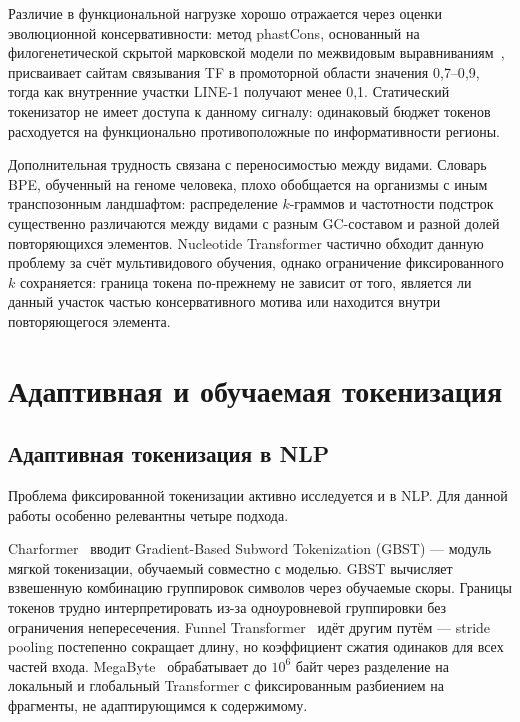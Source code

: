 Различие в функциональной нагрузке хорошо отражается через оценки
эволюционной консервативности: метод phastCons, основанный на
филогенетической скрытой марковской модели по межвидовым
выравниваниям~\cite{siepelEvolutionarilyConservedElements2005},
присваивает сайтам связывания TF в промоторной области значения
0{,}7--0{,}9, тогда как внутренние участки LINE-1 получают менее
0{,}1. Статический токенизатор не имеет доступа к данному сигналу:
одинаковый бюджет токенов расходуется на функционально
противоположные по информативности регионы.

Дополнительная трудность связана с переносимостью между видами.
Словарь BPE, обученный на геноме человека, плохо обобщается на
организмы с иным транспозонным ландшафтом: распределение $k$-граммов
и частотности подстрок существенно различаются между видами с разным
GC-составом и разной долей повторяющихся элементов.
Nucleotide Transformer частично обходит данную проблему за счёт
мультивидового обучения, однако ограничение фиксированного $k$
сохраняется: граница токена по-прежнему не зависит от того, является
ли данный участок частью консервативного мотива или находится внутри
повторяющегося элемента.

\section{Адаптивная и обучаемая токенизация}

\subsection{Адаптивная токенизация в NLP}

Проблема фиксированной токенизации активно исследуется и в NLP. Для
данной работы особенно релевантны четыре подхода.

Charformer~\cite{tayCharformerFastCharacter2022} вводит
Gradient-Based Subword Tokenization (GBST) --- модуль мягкой
токенизации, обучаемый совместно с моделью. GBST вычисляет взвешенную
комбинацию группировок символов через обучаемые скоры. Границы
токенов трудно интерпретировать из-за одноуровневой группировки без
ограничения непересечения. Funnel
Transformer~\cite{daiFunnelTransformerFiltering2020} идёт другим
путём --- stride pooling постепенно сокращает длину, но коэффициент
сжатия одинаков для всех частей входа.
MegaByte~\cite{yuMegaBytePredictingMillionbyte2023} обрабатывает до
$10^6$ байт через разделение на локальный и глобальный Transformer с
фиксированным разбиением на фрагменты, не адаптирующимся к содержимому.

